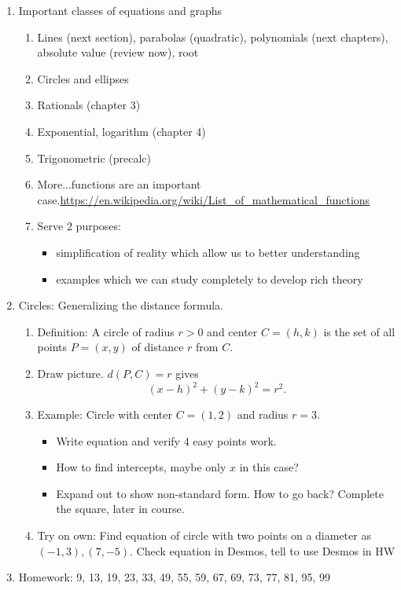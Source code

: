 \documentclass{article}
\begin{document}
\begin{enumerate}
\item Important classes of equations and graphs
\begin{enumerate}
\item Lines (next section), parabolas (quadratic), polynomials (next chapters), absolute value (review now), root
\item Circles and ellipses
\item Rationals (chapter 3)
\item Exponential, logarithm (chapter 4)
\item Trigonometric (precalc)
\item More...functions are an important case.\url{https://en.wikipedia.org/wiki/List_of_mathematical_functions}
\item Serve 2 purposes:
\begin{itemize}
\item simplification of reality which allow us to better understanding
\item examples which we can study completely to develop rich theory
\end{itemize}
\end{enumerate}

\item Circles: Generalizing the distance formula.
\begin{enumerate}
\item Definition: A circle of radius $r>0$ and center $C=(h,k)$ is the set of all points $P=(x,y)$ of distance $r$ from $C$.
\item Draw picture. $d(P,C)=r$ gives
\[
(x-h)^2+(y-k)^2=r^2.
\]
\item Example: Circle with center $C=(1,2)$ and radius $r=3$.
\begin{itemize}
\item Write equation and verify 4 easy points work. 
\item How to find intercepts, maybe only $x$ in this case?
\item Expand out to show non-standard form. How to go back? Complete the square, later in course.
\end{itemize}
\item Try on own: Find equation of circle with two points on a diameter as $(-1,3), (7,-5)$. Check equation in Desmos, tell to use Desmos in HW
\end{enumerate}

\item Homework: 9, 13, 19, 23, 33, 49, 55, 59, 67, 69, 73, 77, 81, 95, 99
\end{enumerate}
\end{document}
